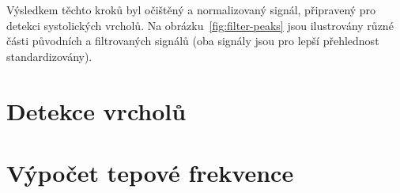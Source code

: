 Výsledkem těchto kroků byl očištěný a normalizovaný signál, připravený pro detekci systolických vrcholů.
Na obrázku~\ref{fig:filter-peaks} jsou ilustrovány různé části původních a filtrovaných signálů (oba signály jsou pro lepší přehlednost standardizovány).

\section{Detekce vrcholů}
\label{sec:alg_peaks}

\section{Výpočet tepové frekvence}
\label{sec:alg_hr}



